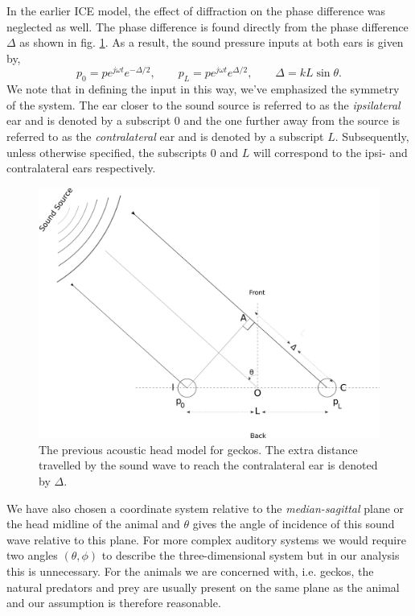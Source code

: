 In the earlier ICE model, the effect of diffraction on the phase difference was neglected as well. The phase difference
is found directly from the phase difference $\Delta$ as shown in fig. \ref{fig:oldheadmodel}.
As a result, the sound pressure inputs at both ears is given by,
\begin{equation}\label{oldsoundinput}
p_0=pe^{j\omega t} e^{-\Delta/2},\qquad p_L=pe^{j\omega t} e^{\Delta/2},\qquad \Delta=kL\sin\theta.
\end{equation}
We note that in defining the input in this way, we've emphasized the symmetry of the system.
The ear closer to the sound source is referred to as the \textit{ipsilateral} ear and
is denoted by a subscript $0$ and the one further away from the source is referred to as the \textit{contralateral} ear and is denoted by a subscript $L$. 
Subsequently, unless otherwise specified, the subscripts $0$ and $L$ will correspond to the ipsi- and contralateral ears respectively.
\begin{figure}[ht]
 \includegraphics[width=.75\linewidth]{Diagrams/acousticheadmodelold.png}
 \caption[Previous acoustic head model for geckos]{The previous acoustic head model for geckos. The extra distance travelled by the sound wave to reach the contralateral ear 
 is denoted by $\Delta$.}
 \label{fig:oldheadmodel}
\end{figure}
We have also chosen a coordinate
system relative to the \textit{median-sagittal} plane or the head midline of the animal and $\theta$ gives the angle of incidence of this
sound wave relative to this plane. For more complex auditory systems we would require two angles $(\theta, \phi)$ to describe
the three-dimensional system but in our analysis this is unnecessary. For the animals we are concerned with, i.e. geckos, the natural
predators and prey are usually present on the same plane as the animal and our assumption is therefore reasonable.


